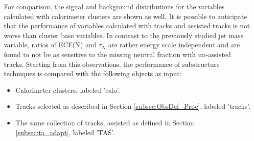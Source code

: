 For comparison, the signal and background distributions for the variables calculated with calorimeter clusters are shown as well. It is possible to anticipate that the performance of variables calculated with tracks and assisted tracks is not worse than cluster base variables.
In contrast to the previously studied jet mass variable, ratios of ECF(N) and $\tau_N$ are rather energy scale independent and are found to not be as sensitive to the missing neutral fraction with un-assisted tracks.
Starting from this observations, the performance of substructure techniques is compared with the following objects as input:
\begin{itemize}
\item Calorimeter clusters, labeled 'calo'.
\item Tracks selected as described in Section \ref{subsec:ObsDef_Proc}, labeled 'tracks'.
\item The same collection of tracks, assisted as defined in Section \ref{subsec:ta_adapt}, labeled 'TAS'.
\end{itemize}